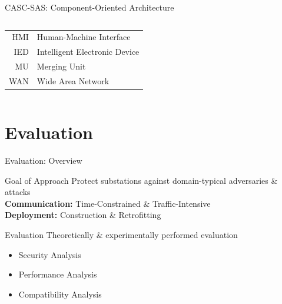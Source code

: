 \documentclass[en]{sdqbeamer}
\begin{document}
\begin{frame}{CASC-SAS: Component-Oriented Architecture}
\begin{columns}
\begin{center}
\begin{tabular}{r l}
                \color{SteelBlue} HMI & \color{SteelBlue} Human-Machine Interface \\
                \color{SteelBlue} IED & \color{SteelBlue} Intelligent Electronic Device \\
                \color{SteelBlue} MU & \color{SteelBlue} Merging Unit \\
                \color{SteelBlue} WAN & \color{SteelBlue} Wide Area Network
            \end{tabular}
        \end{center}
    \end{columns}
\end{frame}

\section{Evaluation}
\begin{frame}{Evaluation: Overview}
    \begin{greenblock}{Goal of Approach}
        Protect substations against domain-typical adversaries \& attacks
        \\\textbf{Communication:} Time-Constrained \& Traffic-Intensive
        \\\textbf{Deployment:} Construction \& Retrofitting
    \end{greenblock}
    \begin{blueblock}{Evaluation}
        Theoretically \& experimentally performed evaluation
        \begin{itemize}
            \item Security Analysis
            \item Performance Analysis
            \item Compatibility Analysis
        \end{itemize}
    \end{blueblock}
\end{frame}
\end{document}
